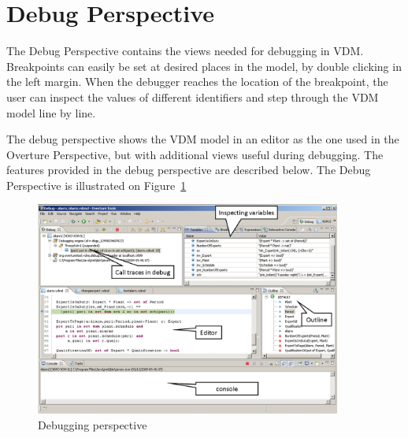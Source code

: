 \documentclass{overturerepchap}
\begin{document}
\section{Debug Perspective}

The Debug Perspective contains the views
needed for debugging in VDM. Breakpoints can easily be set at desired
places in the model, by double clicking in the left margin. When the
debugger reaches the location of the breakpoint, the user can inspect
the values of different identifiers and step through the VDM model
line by line.
 
The debug perspective shows the VDM model in an editor as the one used in the
Overture Perspective, but with additional views useful during
debugging. The features provided in the debug perspective are described below.
The Debug Perspective is illustrated on Figure~\ref{fig:userguide:DebuggingVDM}

\begin{figure}[htp]
\begin{center}
  \includegraphics[width=380px]{figures/DebuggingVDM}
  \caption[Debugging perspective]{Debugging perspective}
  \label{fig:userguide:DebuggingVDM}
\end{center}
\end{figure}

\end{document}
